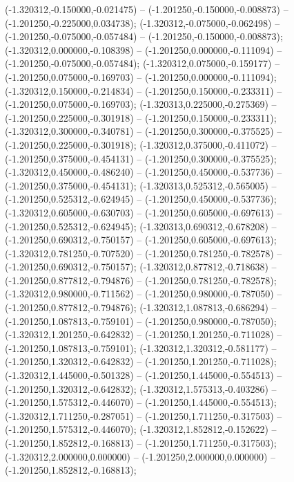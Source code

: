  (-1.320312,-0.150000,-0.021475) -- (-1.201250,-0.150000,-0.008873) -- (-1.201250,-0.225000,0.034738);
 (-1.320312,-0.075000,-0.062498) -- (-1.201250,-0.075000,-0.057484) -- (-1.201250,-0.150000,-0.008873);
 (-1.320312,0.000000,-0.108398) -- (-1.201250,0.000000,-0.111094) -- (-1.201250,-0.075000,-0.057484);
 (-1.320312,0.075000,-0.159177) -- (-1.201250,0.075000,-0.169703) -- (-1.201250,0.000000,-0.111094);
 (-1.320312,0.150000,-0.214834) -- (-1.201250,0.150000,-0.233311) -- (-1.201250,0.075000,-0.169703);
 (-1.320313,0.225000,-0.275369) -- (-1.201250,0.225000,-0.301918) -- (-1.201250,0.150000,-0.233311);
 (-1.320312,0.300000,-0.340781) -- (-1.201250,0.300000,-0.375525) -- (-1.201250,0.225000,-0.301918);
 (-1.320312,0.375000,-0.411072) -- (-1.201250,0.375000,-0.454131) -- (-1.201250,0.300000,-0.375525);
 (-1.320312,0.450000,-0.486240) -- (-1.201250,0.450000,-0.537736) -- (-1.201250,0.375000,-0.454131);
 (-1.320313,0.525312,-0.565005) -- (-1.201250,0.525312,-0.624945) -- (-1.201250,0.450000,-0.537736);
 (-1.320312,0.605000,-0.630703) -- (-1.201250,0.605000,-0.697613) -- (-1.201250,0.525312,-0.624945);
 (-1.320313,0.690312,-0.678208) -- (-1.201250,0.690312,-0.750157) -- (-1.201250,0.605000,-0.697613);
 (-1.320312,0.781250,-0.707520) -- (-1.201250,0.781250,-0.782578) -- (-1.201250,0.690312,-0.750157);
 (-1.320312,0.877812,-0.718638) -- (-1.201250,0.877812,-0.794876) -- (-1.201250,0.781250,-0.782578);
 (-1.320312,0.980000,-0.711562) -- (-1.201250,0.980000,-0.787050) -- (-1.201250,0.877812,-0.794876);
 (-1.320312,1.087813,-0.686294) -- (-1.201250,1.087813,-0.759101) -- (-1.201250,0.980000,-0.787050);
 (-1.320312,1.201250,-0.642832) -- (-1.201250,1.201250,-0.711028) -- (-1.201250,1.087813,-0.759101);
 (-1.320312,1.320312,-0.581177) -- (-1.201250,1.320312,-0.642832) -- (-1.201250,1.201250,-0.711028);
 (-1.320312,1.445000,-0.501328) -- (-1.201250,1.445000,-0.554513) -- (-1.201250,1.320312,-0.642832);
 (-1.320312,1.575313,-0.403286) -- (-1.201250,1.575312,-0.446070) -- (-1.201250,1.445000,-0.554513);
 (-1.320312,1.711250,-0.287051) -- (-1.201250,1.711250,-0.317503) -- (-1.201250,1.575312,-0.446070);
 (-1.320312,1.852812,-0.152622) -- (-1.201250,1.852812,-0.168813) -- (-1.201250,1.711250,-0.317503);
 (-1.320312,2.000000,0.000000) -- (-1.201250,2.000000,0.000000) -- (-1.201250,1.852812,-0.168813);
